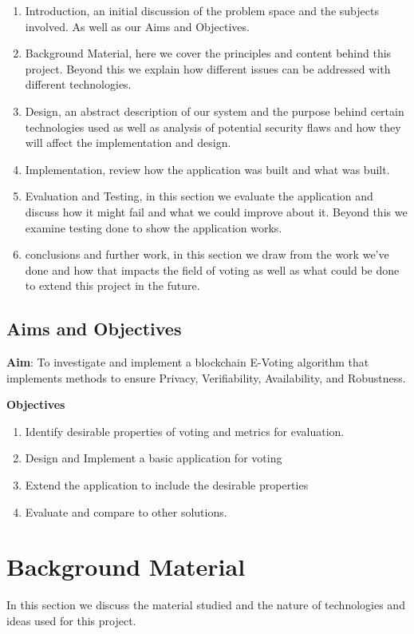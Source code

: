 \documentclass{entcs}
\begin{document}
\begin{enumerate}
    \item Introduction, an initial discussion of the problem space and the subjects involved. As well as our Aims and Objectives.
    \item Background Material, here we cover the principles and content behind this project. Beyond this we explain how different issues can be addressed with different technologies.
    \item Design, an abstract description of our system and the purpose behind certain technologies used as well as analysis of potential security flaws and how they will affect the implementation and design.
    \item Implementation, review how the application was built and what was built.
    \item Evaluation and Testing, in this section we evaluate the application and discuss how it might fail and what we could improve about it. Beyond this we examine testing done to show the application works.
    \item conclusions and further work, in this section we draw from the work we've done and how that impacts the field of voting as well as what could be done to extend this project in the future.
\end{enumerate}

\subsection{Aims and Objectives}
\begin{center}
    {\bf Aim}: To investigate and implement a blockchain E-Voting algorithm that implements methods to ensure Privacy, Verifiability, Availability, and Robustness. 
\end{center}
{\bf Objectives}
\begin{enumerate}
    \item Identify desirable properties of voting and metrics for evaluation.
    \item Design and Implement a basic application for voting
    \item Extend the application to include the desirable properties
    \item Evaluate and compare to other solutions.
\end{enumerate}


\section{Background Material}
In this section we discuss the material studied and the nature of technologies and ideas used for this project.
\end{document}
